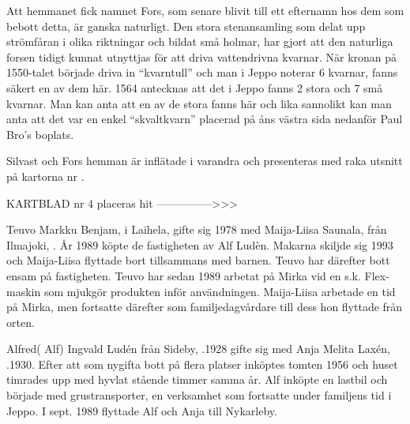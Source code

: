Att hemmanet fick namnet Fors, som senare blivit till ett efternamn hos dem som bebott detta, är ganska naturligt. Den stora stenansamling som delat upp strömfåran i olika riktningar och bildat små holmar, har gjort att den naturliga forsen tidigt kunnat utnyttjas för att driva vattendrivna kvarnar. När kronan på 1550-talet började driva in ``kvarntull'' och man i Jeppo noterar 6 kvarnar, fanns säkert en av dem här. 1564 antecknas att det i Jeppo fanns 2 stora och 7 små kvarnar. Man kan anta att en av de stora fanns här och lika sannolikt kan man anta att det var en enkel ``skvaltkvarn'' placerad på åns västra sida nedanför Paul Bro's boplats.

Silvast och Fors hemman är inflätade i varandra och presenteras med raka utsnitt på kartorna nr .


KARTBLAD nr 4 placeras hit --------------->>>






Teuvo Markku Benjam,  i Laihela, gifte sig 1978 med Maija-Liisa Saunala, från Ilmajoki, . År 1989 köpte de fastigheten av Alf Ludèn. Makarna skiljde sig 1993 och Maija-Liisa flyttade bort tillsammans med barnen. Teuvo har därefter bott ensam på fastigheten. Teuvo har sedan 1989 arbetat på Mirka vid en s.k. Flex-maskin som mjukgör produkten inför användningen. Maija-Liisa arbetade en tid på Mirka, men fortsatte därefter som familjedagvårdare till dess hon flyttade från orten.


\begin{jhchildren}
  \item {}
  \item {}
  \item {}
  \item {}
\end{jhchildren}


Alfred( Alf) Ingvald Ludén från Sideby, .1928 gifte sig med Anja Melita Laxén, .1930. Efter att som nygifta bott på flera platser inköptes tomten 1956 och huset timrades upp med hyvlat stående timmer samma år. Alf inköpte en lastbil och började med grustransporter, en verksamhet som fortsatte under familjens tid i Jeppo. I sept. 1989 flyttade Alf och Anja till Nykarleby.
\begin{jhchildren}
  \item {}
  \item {}
\end{jhchildren}

